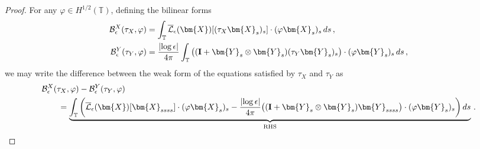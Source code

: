 \documentclass[11pt,reqno]{amsart}
\newcommand{\T}{\mathbb{T}}
\newcommand{\X}{\bm{X}}
\newcommand{\Y}{\bm{Y}}
\newcommand{\abs}[1]{\left\lvert #1 \right\rvert}
\newcommand{\mc}[1]{\mathcal{#1}}
\numberwithin{equation}{section}
\theoremstyle{definition}
\begin{document}
\begin{proof}
For any $\varphi\in H^{1/2}(\T)$, defining the bilinear forms
\begin{equation}
\begin{aligned}
  \mc{B}_\epsilon^X(\tau_X,\varphi) &= \int_\T \overline{\mc{L}}_\epsilon(\X)[(\tau_X\X_s)_s] \cdot(\varphi\X_s)_s\,ds \,,\\
  \mc{B}_\epsilon^Y(\tau_Y,\varphi) &= \frac{\abs{\log\epsilon}}{4\pi}\int_\T \big(({\bf I}+\Y_s\otimes\Y_s)(\tau_Y\Y_s)_s\big) \cdot(\varphi\Y_s)_s\,ds\,,
\end{aligned}
\end{equation}
we may write the difference between the weak form of the equations satisfied by $\tau_X$ and $\tau_Y$ as 
\begin{equation}\label{eq:diffXY_weak}
\begin{aligned}
  &\mc{B}_\epsilon^X(\tau_X,\varphi) - \mc{B}_\epsilon^Y(\tau_Y,\varphi) \\
  &\qquad = \underbrace{\int_\T \bigg(\overline{\mc{L}}_\epsilon(\X)[\X_{ssss}]\cdot(\varphi\X_s)_s - \frac{\abs{\log\epsilon}}{4\pi}\big(({\bf I}+\Y_s\otimes\Y_s)\Y_{ssss}\big)\cdot(\varphi\Y_s)_s\bigg)\,ds }_{{\rm RHS}}\,.
\end{aligned}
\end{equation}



\end{proof}
\end{document}
